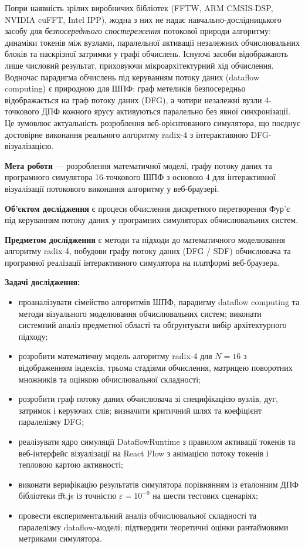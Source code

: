 Попри наявність зрілих виробничих бібліотек (FFTW, ARM CMSIS-DSP, NVIDIA
cuFFT, Intel IPP), жодна з них не надає навчально-дослідницького засобу
для \emph{безпосереднього спостереження} потокової природи алгоритму:
динаміки токенів між вузлами, паралельної активації незалежних
обчислювальних блоків та наскрізної затримки у графі обчислень. Існуючі
засоби відображають лише числовий результат, приховуючи
мікроархітектурний хід обчислення. Водночас парадигма обчислень під
керуванням потоку даних (dataflow computing) є природною для ШПФ: граф
метеликів безпосередньо відображається на граф потоку даних (DFG), а
чотири незалежні вузли 4-точкового ДПФ кожного ярусу активуються
паралельно без явної синхронізації. Це зумовлює актуальність розроблення
веб-орієнтованого симулятора, що поєднує достовірне виконання реального
алгоритму radix-4 з інтерактивною DFG-візуалізацією.

\textbf{Мета роботи} --- розроблення математичної моделі, графу потоку
даних та програмного симулятора 16-точкового ШПФ з основою 4 для
інтерактивної візуалізації потокового виконання алгоритму у
веб-браузері.

\textbf{Об'єктом дослідження} є процеси обчислення дискретного
перетворення Фур'є під керуванням потоку даних у програмних симуляторах
обчислювальних систем.

\textbf{Предметом дослідження} є методи та підходи до математичного
моделювання алгоритму radix-4, побудови графу потоку даних (DFG / SDF)
обчислювача та програмної реалізації інтерактивного симулятора на
платформі веб-браузера.

\textbf{Задачі дослідження:}

\begin{itemize}
\item
  проаналізувати сімейство алгоритмів ШПФ, парадигму dataflow computing
  та методи візуального моделювання обчислювальних систем; виконати
  системний аналіз предметної області та обґрунтувати вибір
  архітектурного підходу;
\item
  розробити математичну модель алгоритму radix-4 для \(N = 16\) з
  відображенням індексів, трьома стадіями обчислення, матрицею
  поворотних множників та оцінкою обчислювальної складності;
\item
  розробити граф потоку даних обчислювача зі специфікацією вузлів, дуг,
  затримок і керуючих слів; визначити критичний шлях та коефіцієнт
  паралелізму DFG;
\item
  реалізувати ядро симуляції DataflowRuntime з правилом активації
  токенів та веб-інтерфейс візуалізації на React Flow з анімацією потоку
  токенів і тепловою картою активності;
\item
  виконати верифікацію результатів симулятора порівнянням із еталонним
  ДПФ бібліотеки fft.js із точністю \(\varepsilon = 10^{- 9}\) на шести
  тестових сценаріях;
\item
  провести експериментальний аналіз обчислювальної складності та
  паралелізму dataflow-моделі; підтвердити теоретичні оцінки
  рантаймовими метриками симулятора.
\end{itemize}

